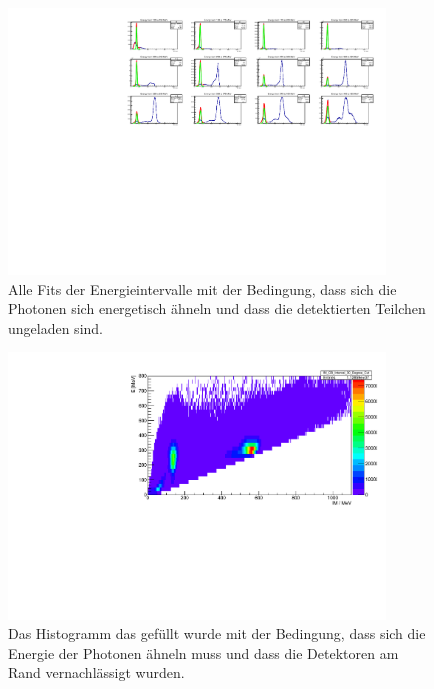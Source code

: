 \documentclass[a4paper,11pt,oneside,final,german,openbib,pdftex]{scrbook}
\begin{document}
{\begin{appendix}
\begin{figure}[h!]
	\begin{center}
		\includegraphics[width=100mm]{EnergyIntervalAllFitsUncharged}
		\caption{Alle Fits der Energieintervalle mit der Bedingung, dass sich die Photonen sich energetisch ähneln und dass die detektierten Teilchen ungeladen sind.}
		\label{fig:similarenergyallfitsuncharged}
	\end{center}
\end{figure}

\begin{figure}[h!]
	\begin{center}
		\includegraphics[width=100mm]{30DegreeCutHistRealData}
		\caption{Das Histogramm das gef\"ullt wurde mit der Bedingung, dass sich die Energie der Photonen \"ahneln muss und dass die Detektoren am Rand vernachl\"assigt wurden.}
		\label{fig:30-Degree-Cut-Histogramm}
	\end{center}
\end{figure}



\end{appendix}}
\end{document}
